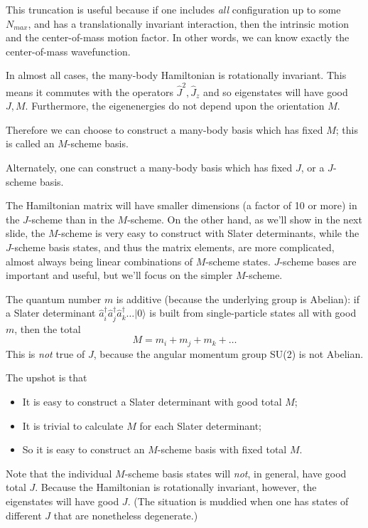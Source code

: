 This truncation is useful because if one includes \emph{all} configuration up to 
some $N_{max}$, and has a translationally invariant interaction, then the intrinsic 
motion and the center-of-mass motion factor. In other words, we can know exactly 
the center-of-mass wavefunction. 

In almost all cases, the many-body Hamiltonian is rotationally invariant. This means 
it commutes with the operators $\hat{J}^2, \hat{J}_z$ and so eigenstates will have 
good $J,M$. Furthermore, the eigenenergies do not depend upon the orientation $M$. 


Therefore we can choose to construct a many-body basis which has fixed $M$; this is 
called an $M$-scheme basis. 


Alternately, one can construct a many-body basis which has fixed $J$, or a $J$-scheme 
basis. 

The Hamiltonian matrix will have smaller dimensions (a factor of 10 or more) in the $J$-scheme than in the $M$-scheme. 
On the other hand, as we'll show in the next slide, the $M$-scheme is very easy to 
construct with Slater determinants, while the $J$-scheme basis states, and thus the 
matrix elements, are more complicated, almost always being linear combinations of 
$M$-scheme states. $J$-scheme bases are important and useful, but we'll focus on the 
simpler $M$-scheme.

The quantum number $m$ is additive (because the underlying group is Abelian): 
if a Slater determinant $\hat{a}_i^\dagger \hat{a}^\dagger_j \hat{a}^\dagger_k \ldots | 0 \rangle$ 
is built from single-particle states all with good $m$, then the total 
\[
M = m_i + m_j + m_k + \ldots
\]
This is \emph{not} true of $J$, because the angular momentum group SU(2) is not Abelian.

The upshot is that 
\begin{itemize}
\item It is easy to construct a Slater determinant with good total $M$;

\item It is trivial to calculate $M$ for each Slater determinant;

\item So it is easy to construct an $M$-scheme basis with fixed total $M$.
\end{itemize}

\noindent
Note that the individual $M$-scheme basis states will \emph{not}, in general, 
have good total $J$. 
Because the Hamiltonian is rotationally invariant, however, the eigenstates will 
have good $J$. (The situation is muddied when one has states of different $J$ that are 
nonetheless degenerate.) 




